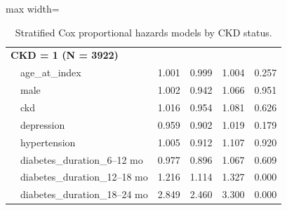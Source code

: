 \documentclass[twoside,11pt]{article}
\begin{document}
\begin{table}[H]
\begin{adjustbox}{max width=\textwidth}
\begin{tabular}{llcccc}
      \multicolumn{6}{l}{\textbf{CKD = 1 (N = 3922)}}                                                                                   \\
                       & age\_at\_index                & 1.001       & 0.999           & 1.004            & 0.257                       \\
                       & male                          & 1.002       & 0.942           & 1.066            & 0.951                       \\
                       & ckd                           & 1.016       & 0.954           & 1.081            & 0.626                       \\
                       & depression                    & 0.959       & 0.902           & 1.019            & 0.179                       \\
                       & hypertension                  & 1.005       & 0.912           & 1.107            & 0.920                       \\
                       & diabetes\_duration\_6--12 mo  & 0.977       & 0.896           & 1.067            & 0.609                       \\
                       & diabetes\_duration\_12--18 mo & 1.216       & 1.114           & 1.327            & \cellcolor{lightgreen}0.000 \\
                       & diabetes\_duration\_18--24 mo & 2.849       & 2.460           & 3.300            & \cellcolor{lightgreen}0.000 \\

      \hline
    \end{tabular}
  \end{adjustbox}
  \caption{Stratified Cox proportional hazards models by CKD status.}
  \label{tab:ckd_stratified}
\end{table}
\end{document}
